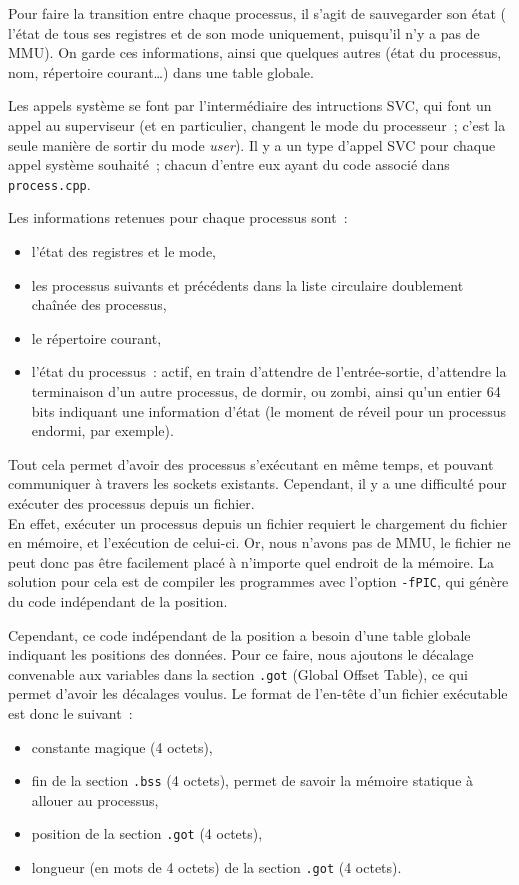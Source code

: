 \documentclass[11pt,a4paper]{article}
\newcommand{\fname}[1]{\texttt{#1}} %
\begin{document}
Pour faire la transition entre chaque processus, il s'agit de
sauvegarder son état (\ie{} l'état de tous ses registres et de son mode
uniquement, puisqu'il n'y a pas de MMU). On garde ces informations,
ainsi que quelques autres (état du processus, nom, répertoire
courant\ldots) dans une table globale.

Les appels système se font par l'intermédiaire des intructions SVC,
qui font un appel au superviseur (et en particulier, changent le mode
du processeur~; c'est la seule manière de sortir du mode
\textit{user}). Il y a un type d'appel SVC pour chaque appel système
souhaité~; chacun d'entre eux ayant du code associé dans
\fname{process.cpp}.

Les informations retenues pour chaque processus sont~:
\begin{itemize}
\item{l'état des registres et le mode,}
\item{les processus suivants et précédents dans la liste circulaire
  doublement chaînée des processus,}
\item{le répertoire courant,}
\item{l'état du processus~: actif, en train d'attendre de
  l'entrée-sortie, d'attendre la terminaison d'un autre processus,
  de dormir, ou zombi, ainsi qu'un entier 64 bits indiquant une
  information d'état (le moment de réveil pour un processus endormi,
  par exemple).}
\end{itemize}

Tout cela permet d'avoir des processus s'exécutant en même temps, et
pouvant communiquer à travers les sockets existants. Cependant, il
y a une difficulté pour exécuter des processus depuis un fichier.
\\

En effet, exécuter un processus depuis un fichier requiert le
chargement du fichier en mémoire, et l'exécution de celui-ci. Or, nous
n'avons pas de MMU, le fichier ne peut donc pas être facilement placé
à n'importe quel endroit de la mémoire. La solution pour cela est de
compiler les programmes avec l'option \texttt{-fPIC}, qui génère du
code indépendant de la position.

Cependant, ce code indépendant de la position a besoin d'une table
globale indiquant les positions des données. Pour ce faire, nous
ajoutons le décalage convenable aux variables dans la section
\texttt{.got} (Global Offset Table), ce qui permet d'avoir les
décalages voulus. Le format de l'en-tête d'un fichier exécutable est
donc le suivant~:
\begin{itemize}
\item{constante magique  (4 octets),}
\item{fin de la section \texttt{.bss} (4 octets), permet de savoir la
  mémoire statique à allouer au processus,}
\item{position de la section \texttt{.got} (4 octets),}
\item{longueur (en mots de 4 octets) de la section \texttt{.got} (4 octets).\\}
\end{itemize}
\end{document}
